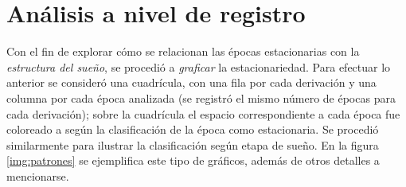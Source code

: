 \documentclass[12pt,letterpaper]{book}
\begin{document}
\section{Análisis a nivel de registro}
\label{sec:analisis_registro}

Con el fin de explorar cómo se relacionan las épocas estacionarias con la \textit{estructura del sueño}, se procedió a \textit{graficar} la estacionariedad.
%
Para efectuar lo anterior se consideró una cuadrícula, con una fila por cada derivación y una columna por cada época analizada (se registró el mismo número de épocas para cada derivación); sobre la cuadrícula el espacio correspondiente a cada época fue coloreado a según la clasificación de la época como estacionaria.
%
Se procedió similarmente para ilustrar la clasificación según etapa de sueño.
%
En la figura \ref{img:patrones} se ejemplifica este tipo de gráficos, además de otros detalles a mencionarse.
\end{document}
